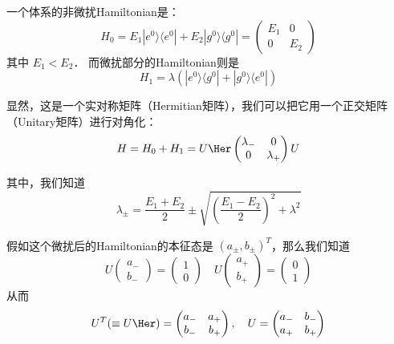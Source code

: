 \begin{exer}{}
一个体系的非微扰Hamiltonian是：
\begin{equation}
H_0 = E_1|e^0\rangle\langle e^0| + E_2|g^0\rangle\langle g^0| =  \left(\begin{matrix} E_1 & 0\\ 0 & E_2\end{matrix}\right)
\end{equation}
其中 $E_1<E_2$． 而微扰部分的Hamiltonian则是
\begin{equation}
H_1 = \lambda(|e^0\rangle\langle g^0|+|g^0\rangle\langle e^0|)
\end{equation}

显然，这是一个实对称矩阵（Hermitian矩阵），我们可以把它用一个正交矩阵（Unitary矩阵）进行对角化：
\begin{equation}
H = H_0+H_1 = U\Her\left(\begin{matrix} \lambda_- & 0\\0 & \lambda_+\end{matrix}\right)U
\end{equation}

其中，我们知道
\begin{equation}
\lambda_{\pm} = \frac{E_1+E_2}{2} \pm \sqrt{\left( \frac{E_1-E_2}{2}\right)^2 + \lambda^2}
\end{equation}

假如这个微扰后的Hamiltonian的本征态是 $(a_\pm,b_\pm)^T$，那么我们知道
\begin{equation}
U\left(\begin{matrix}a_-\\b_-\end{matrix}\right) = \left(\begin{matrix}1\\0\end{matrix}\right)\quad U\left(\begin{matrix}a_+\\b_+\end{matrix}\right) = \left(\begin{matrix}0\\1\end{matrix}\right)
\end{equation}
从而
\begin{equation}
U^T(\equiv U\Her) = \left(\begin{matrix}a_- & a_+\\b_- & b_+\end{matrix}\right), \quad U = \left(\begin{matrix}a_- & b_-\\a_+ & b_+\end{matrix}\right)
\end{equation}


\end{exer}
